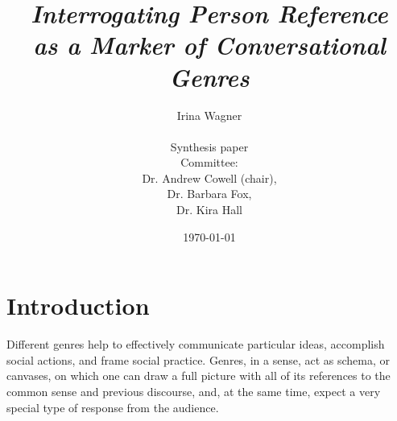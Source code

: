 \documentclass[12pt]{article}
\title{\textit{Interrogating Person Reference \\ as a Marker of Conversational Genres}}
\author{Irina Wagner\\ \\ Synthesis paper \\ Committee: \\ Dr. Andrew Cowell (chair), \\ Dr. Barbara Fox, \\ Dr. Kira Hall}
\date{\today}
\begin{document}
\begin{titlingpage}
\setlength{\droptitle}{80pt}

\maketitle

\end{titlingpage}
\doublespacing
\indent

\section{Introduction}
Different genres help to effectively communicate particular ideas, accomplish social actions, and frame social practice. Genres, in a sense, act as schema, or canvases, on which one can draw a full picture with all of its references to the common sense and previous discourse, and, at the same time, expect a very special type of response from the audience. 
\end{document}
